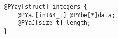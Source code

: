 \begin{Verbatim}[commandchars=@\[\]]
@PYay[struct] integers {
    @PYaJ[int64_t] @PYbe[*]data;
    @PYaJ[size_t] length;
}
\end{Verbatim}
